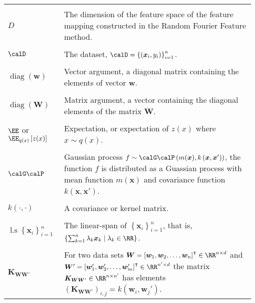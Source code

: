 \begin{longtable}{lp{}}
    \\\\
    $D$                                                                                                        & The dimension of the feature space of the feature mapping constructed in the Random Fourier Feature method.
    \\\\
    $\calD$                                                                                                    & The dataset, $\calD = \left\{ \left( \bm{x}_i , y_{i} \right) \right\}_{i=1}^{n}$.
    \\\\
    $\operatorname{diag} \left( \bm{w} \right)$                                                                & Vector argument, a diagonal matrix containing the elements of vector $\bm{w}$.
    \\\\
    $\operatorname{diag} \left( \bm{W} \right)$                                                                & Matrix argument, a vector containing the diagonal elements of the matrix $\bm{W}$.
    \\\\
    $\EE$ or $\EE_{q(x)} \left[ z(x) \right]$                                                                  & Expectation, or expectation of $z(x)$ where $x \sim q(x)$.
    \\\\
    $\calG \calP$                                                                                              & Gaussian process $f \sim \calG \calP \left( m (\bm{x}), k \left( \bm{x}, \bm{x}' \right) \right)$, the function $f$ is distributed as a Guassian process with mean function $m \left( \bm{x} \right)$ and covariance function $k \left( \bm{x}, \bm{x}' \right)$.
    \\\\
    $k \left( \cdot , \cdot \right)$                                                                           & A covariance or kernel matrix.
    \\\\
    $\operatorname{l.s} \left\{ \bm{x}_i  \right\}_{i=1}^{n}$                                                  & The linear-span of $\left\{ \bm{x}_i  \right\}_{i=1}^{n}$, that is, $\left\{ \sum_{k=1}^{n} \lambda_k \bm{x}_k \mid \lambda_k \in \RR \right\}$.
    \\\\
    $\bm{K}_{\bm{W} \bm{W}'}$                                                                                  & For two data sets $\bm{W} = \left[ \bm{w}_1 ,\bm{w}_2 , \ldots , \bm{w}_n \right]^{\intercal} \in \RR^{n \times d}$ and $\bm{W}' = \left[ \bm{w}_1' ,\bm{w}_2' , \ldots , \bm{w}_m' \right]^{\intercal} \in \RR^{n' \times d}$ the matrix \( \bm{K}_{\bm{W} \bm{W}'} \in \RR^{n \times n'} \) has elements $\left( \bm{K}_{\bm{W} \bm{W}'} \right)_{i,j} = k \left( \bm{w}_i , \bm{w}_j' \right)$.

\end{longtable}
